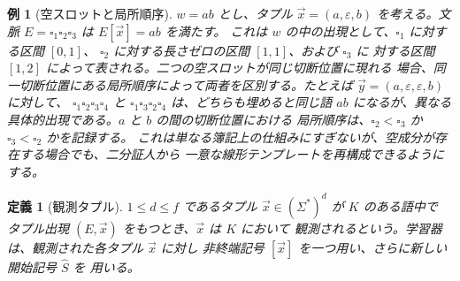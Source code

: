 \documentclass[11pt,a4paper]{ltjsarticle}
\newtheorem{definition}[theorem]{定義}
\newtheorem{example}[theorem]{例}
\theoremstyle{remark}
\newcommand{\tuple}[1]{\vec{#1}}
\newcommand{\blank}{\square}
\newcommand{\eps}{\varepsilon}
\begin{document}
\begin{example}[空スロットと局所順序]
\label{ex:empty-slots}
\(w=ab\) とし、タプル \(\tuple x=(a,\eps,b)\) を考える。文脈
\(E=\blank_1\blank_2\blank_3\) は \(E[\tuple x]=ab\) を満たす。
これは \(w\) の中の出現として、\(\blank_1\) に対する区間 \([0,1]\)、
\(\blank_2\) に対する長さゼロの区間 \([1,1]\)、および \(\blank_3\) に
対する区間 \([1,2]\) によって表される。二つの空スロットが同じ切断位置に現れる
場合、同一切断位置にある局所順序によって両者を区別する。たとえば
\(\tuple y=(a,\eps,\eps,b)\) に対して、
\(\blank_1\blank_2\blank_3\blank_4\) と
\(\blank_1\blank_3\blank_2\blank_4\) は、どちらも埋めると同じ語 \(ab\)
になるが、異なる具体的出現である。\(a\) と \(b\) の間の切断位置における
局所順序は、\(\blank_2<\blank_3\) か \(\blank_3<\blank_2\) かを記録する。
これは単なる簿記上の仕組みにすぎないが、空成分が存在する場合でも、二分証人から
一意な線形テンプレートを再構成できるようにする。
\end{example}

\begin{definition}[観測タプル]
\label{def:observed-tuple}
\(1\le d\le f\) であるタプル \(\tuple x\in(\Sigma^*)^d\) が \(K\) のある語中で
タプル出現 \((E,\tuple x)\) をもつとき、\(\tuple x\) は \(K\) において
\emph{観測される}という。学習器は、観測された各タプル \(\tuple x\) に対し
非終端記号 \([\tuple x]\) を一つ用い、さらに新しい開始記号 \(\widehat S\) を
用いる。
\end{definition}
\end{document}
